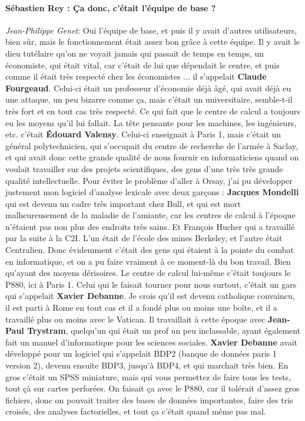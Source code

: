 \paragraph*{Sébastien Rey : Ça donc, c'était l'équipe de base ?}

\noindent\emph{Jean-Philippe Genet}: Oui l'équipe de base, et puis il y avait d'autres utilisateurs, bien sûr, mais le fonctionnement était assez bon grâce à cette équipe. Il y avait le dieu tutélaire qu'on ne voyait jamais qui passait de temps en temps, un économiste, qui était vital, car c'était de lui que dépendait le centre, et puis comme il était très respecté chez les économistes ... il s'appelait \textbf{Claude Fourgeaud}. Celui-ci était un professeur d'économie déjà âgé, qui avait déjà eu une attaque, un peu bizarre comme ça, mais c'était un universitaire, semble-t-il très fort et en tout cas très respecté. Ce qui fait que le centre de calcul a toujours eu les moyens qu'il lui fallait. La tête pensante pour les machines, les ingénieurs, etc. c'était \textbf{Édouard Valensy}. Celui-ci enseignait à Paris 1, mais c'était un général polytechnicien, qui s'occupait du centre de recherche de l'armée à Saclay, et qui avait donc cette grande qualité de nous fournir en informaticiens quand on voulait travailler sur des projets scientifiques, des gens d'une très très grande qualité intellectuelle. Pour éviter le problème d'aller à Orsay, j'ai pu développer justement mon logiciel d'analyse lexicale avec deux garçons : \textbf{Jacques Mondelli} qui est devenu un cadre très important chez Bull, et qui est mort malheureusement de la maladie de l'amiante, car les centres de calcul à l'époque n'étaient pas non plus des endroits très sains. Et François Hucher qui a travaillé par la suite à la C2I. L'un était de l'école des mines Berkeley, et l'autre était Centralien. Donc évidemment c'était des gens qui étaient à la pointe du combat en informatique, et on a pu faire vraiment à ce moment-là du bon travail. Bien qu'ayant des moyens dérisoires. Le centre de calcul lui-même c'était toujours le P880, ici à Paris 1. Celui qui le faisait tourner pour nous surtout, c'était un gars qui s'appelait \textbf{Xavier Debanne}. Je crois qu'il est devenu catholique convaincu, il est parti à Rome en tout cas et il a fondé plus ou moins une boîte, et il a travaillé plus ou moins avec le Vatican. Il travaillait à cette époque avec \textbf{Jean-Paul Trystram}, quelqu'un qui était un prof un peu inclassable, ayant également fait un manuel d'informatique pour les sciences sociales. \textbf{Xavier Debanne} avait développé pour un logiciel qui s'appelait BDP2 (banque de données paris 1 version 2), devenu ensuite BDP3, jusqu'à BDP4, et qui marchait très bien. En gros c'était un SPSS miniature, mais qui vous permettez de faire tous les tests, tout çà sur cartes perforées. On faisait ça avec le P880, car il tolérait d'assez gros fichiers, donc on pouvait traiter des bases de données importantes, faire des tris croisés, des analyses factorielles, et tout ça c'était quand même pas mal. 

